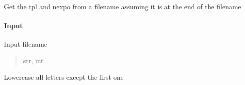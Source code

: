 \documentclass[letterpaper,10pt,english]{sphinxmanual}
\begin{document}
\begin{fulllineitems}
\label{\detokenize{api/pymusepipe:pymusepipe.util_pipe.get_tpl_nexpo}}
\pysigstartsignatures
{}
\pysigstopsignatures
\sphinxAtStartPar
Get the tpl and nexpo from a filename assuming it is at the end
of the filename


\paragraph{Input}
\label{\detokenize{api/pymusepipe:id171}}\begin{description}
\sphinxAtStartPar
Input filename

\end{description}
\begin{quote}\begin{description}
\sphinxAtStartPar
{}

\sphinxAtStartPar
str, int

\end{description}\end{quote}

\end{fulllineitems}


\begin{fulllineitems}
\label{\detokenize{api/pymusepipe:pymusepipe.util_pipe.lower_allbutfirst_letter}}
\pysigstartsignatures
{}
\pysigstopsignatures
\sphinxAtStartPar
Lowercase all letters except the first one

\end{fulllineitems}

\end{document}
